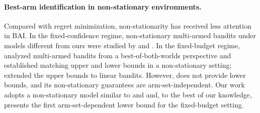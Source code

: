 \paragraph{Best-arm identification in non-stationary environments.}
Compared with regret minimization, non-stationarity has received less attention in BAI. In the fixed-confidence regime, non-stationary multi-armed bandits under models different from ours were studied by \citet{jamieson2016non} and \citet{li2018hyperband}. In the fixed-budget regime, \citet{abbasi2018best} analyzed multi-armed bandits from a best-of-both-worlds perspective and established matching upper and lower bounds in a non-stationary setting; \citet{xiong2024b} extended the upper bounds to linear bandits. However, \citet{xiong2024b} does not provide lower bounds, and its non-stationary guarantees are arm-set-independent. Our work adopts a non-stationary model similar to \citet{abbasi2018best} and \citet{xiong2024b} and, to the best of our knowledge, presents the first arm-set-dependent lower bound for the fixed-budget setting.



